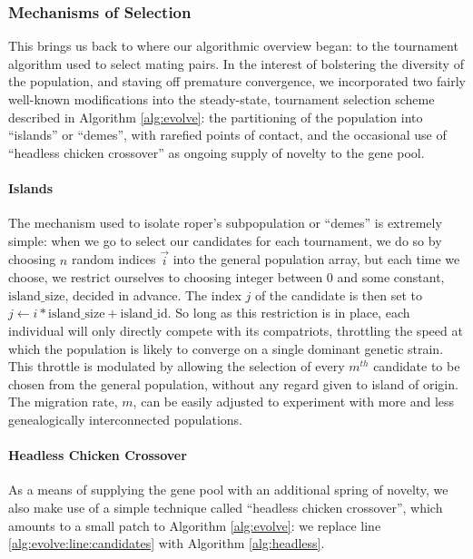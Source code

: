 \documentclass[12pt,glossary]{dalthesis}
\begin{document}
\subsubsection{Mechanisms of Selection}
\label{sec:org9178209}
This brings us back to where our algorithmic overview began: to the tournament
algorithm used to select mating pairs. In the interest of bolstering the diversity
of the population, and staving off premature convergence, we incorporated two
fairly well-known modifications into the steady-state, tournament selection
scheme described in Algorithm \ref{alg:evolve}: the partitioning of the population
into ``islands'' or ``demes'', with rarefied points of contact, and the occasional use of 
``headless chicken crossover'' as ongoing supply of novelty to the gene pool.

\paragraph{Islands}
\label{sec:org1728ba6}
The mechanism used to isolate \gls{roper}'s subpopulation or ``demes'' is extremely simple:
when we go to select our candidates for each tournament, we do so by choosing 
\(n\) random indices \(\vec{i}\) into the general population array, but each time we
choose, we restrict ourselves to choosing integer between 0 and some constant, 
\(\text{island\_size}\), decided in advance. The index \(j\) of the candidate is then
set to \(j \gets i * \text{island\_size} + \text{island\_id}\). So long as this 
restriction is in place, each individual will only directly compete with its
compatriots, throttling the speed at which the population is likely to converge
on a single dominant genetic strain. This throttle is modulated by allowing the
selection of every \(m^{th}\) candidate to be chosen from the general population,
without any regard given to island of origin. The migration rate, \(m\), can be
easily adjusted to experiment with more and less genealogically interconnected
populations.

\paragraph{Headless Chicken Crossover}
\label{sec:org3db7fa9}
As a means of supplying the gene pool with an additional spring of novelty,
we also make use of a simple technique called ``headless chicken crossover'',
which amounts to a small patch to Algorithm \ref{alg:evolve}: we replace
line \ref{alg:evolve:line:candidates} with Algorithm \ref{alg:headless}.
\end{document}

